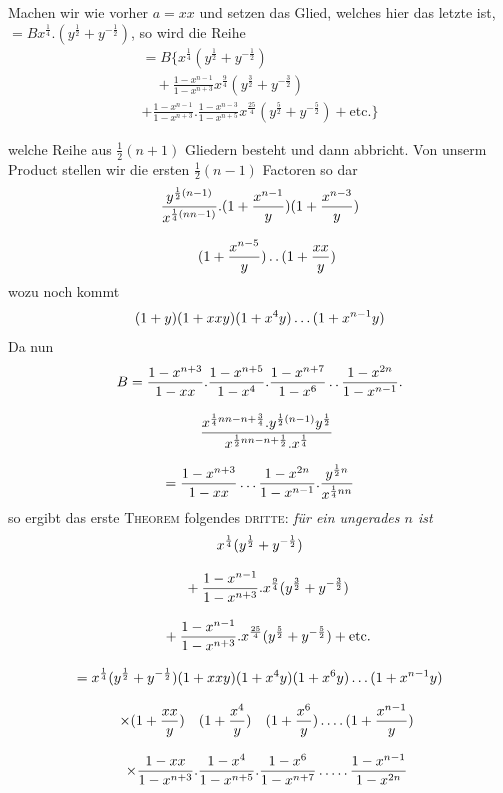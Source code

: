 Machen wir wie vorher $a=xx$ und setzen das Glied, welches hier das letzte ist, $=Bx^{\frac14}.(y^{\frac12}+y^{-\frac12})$, so wird die Reihe
\[
\begin{gathered}
=B\{x^{\frac14}(y^{\frac12}+y^{-\frac12})
\\[8pt]\quad{}+\frac{1-x^{n-1}}{1-x^{n+3}}x^{\frac94}(y^{\frac32}+y^{-\frac32})\\[8pt]
+\frac{1-x^{n-1}}{1-x^{n+3}}.\frac{1-x^{n-3}}{1-x^{n+5}}x^{\frac{25}4}(y^{\frac52}+y^{-\frac52})+\text{etc.}\}
\end{gathered}
\]



welche Reihe aus $\frac12(n+1)$ Gliedern besteht und dann abbricht. Von unserm Product stellen wir die ersten $\frac12(n-1)$ Factoren so dar
\[
\begin{gathered}\frac{y^{\frac12(n-1)}}{x^{\frac14(nn-1)}}.(1+\frac{x^{n-1}}y)(1+\frac{x^{n-3}}y)\\[8pt]\quad{}(1+\frac{x^{n-5}}y)\mathinner{.\,.}(1+\frac{xx}y)\end{gathered}
\]
wozu noch kommt
\[
(1+y)(1+xxy)(1+x^4y)\mathinner{.\,.\,.}(1+x^{n-1}y)
\]
Da nun
\[
\begin{gathered}
B=\frac{1-x^{n+3}}{1-xx}.\frac{1-x^{n+5}}{1-x^4}.\frac{1-x^{n+7}}{1-x^6}\mathinner{.\,.}\frac{1-x^{2n}}{1-x^{n-1}}.
\\[8pt]\quad{}\frac{x^{\frac14nn-n+\frac34}.y^{\frac12(n-1)}y^{\frac12}}{x^{\frac12nn-n+\frac12}.x^{\frac14}}\\[8pt]
=\frac{1-x^{n+3}}{1-xx}\mathinner{.\,.\,.}\frac{1-x^{2n}}{1-x^{n-1}}.\frac{y^{\frac12n}}{x^{\frac14nn}}
\end{gathered}
\]
so ergibt das erste \textsc{Theorem} folgendes \textsc{dritte}: \textit{für ein ungerades $n$ ist}
\[
\begin{gathered}
x^{\frac14}(y^{\frac12}+y^{-\frac12})
\\[8pt]\quad{}+\frac{1-x^{n-1}}{1-x^{n+3}}.x^{\frac94}(y^{\frac32}+y^{-\frac32})
\\[8pt]\quad{}+\frac{1-x^{n-1}}{1-x^{n+3}}.x^{\frac{25}4}(y^{\frac52}+y^{-\frac52})+\text{etc.}\\[8pt]
=x^{\frac14}(y^{\frac12}+y^{-\frac12})(1+xxy)(1+x^4y)(1+x^6y)\mathinner{.\,.\,.}(1+x^{n-1}y)\\[8pt]
\quad\times(1+\frac{xx}y)\quad(1+\frac{x^4}y)\quad(1+\frac{x^6}y)\mathinner{.\,.\,.\,.}(1+\frac{x^{n-1}}y)\\[8pt]
\quad\times\frac{1-xx}{1-x^{n+3}}.\frac{1-x^4}{1-x^{n+5}}.\frac{1-x^6}{1-x^{n+7}}\mathinner{.\,.\,.\,.\,.}\frac{1-x^{n-1}}{1-x^{2n}}
\end{gathered}
\]

